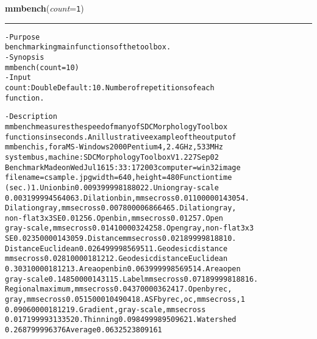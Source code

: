     \begin{boxedminipage}{\textwidth}

    \raggedright \textbf{mmbench}(\textit{count}=\texttt{1\-})

    \vspace{-1.5ex}

    \rule{\textwidth}{0.5\fboxrule}
\begin{alltt}
- Purpose
    benchmarking main functions of the toolbox.
- Synopsis
    mmbench(count=10)
- Input
    count: Double Default: 10. Number of repetitions of each
           function.

- Description
    mmbench measures the speed of many of SDC Morphology Toolbox
    functions in seconds. An illustrative example of the output of
    mmbench is, for a MS-Windows 2000 Pentium 4, 2.4GHz, 533MHz
    system bus, machine: SDC Morphology Toolbox V1.2 27Sep02
    Benchmark Made on Wed Jul 16 15:33:17 2003 computer= win32 image
    filename= csample.jpg width= 640 , height= 480 Function time
    (sec.) 1. Union bin 0.00939999818802 2. Union gray-scale
    0.00319999456406 3. Dilation bin, mmsecross 0.0110000014305 4.
    Dilation gray, mmsecross 0.00780000686646 5. Dilation gray,
    non-flat 3x3 SE 0.0125 6. Open bin, mmsecross 0.0125 7. Open
    gray-scale, mmsecross 0.0141000032425 8. Open gray, non-flat 3x3
    SE 0.0235000014305 9. Distance mmsecross 0.021899998188 10.
    Distance Euclidean 0.0264999985695 11. Geodesic distance
    mmsecross 0.028100001812 12. Geodesic distance Euclidean
    0.303100001812 13. Area open bin 0.0639999985695 14. Area open
    gray-scale 0.148500001431 15. Label mmsecross 0.071899998188 16.
    Regional maximum, mmsecross 0.043700003624 17. Open by rec,
    gray, mmsecross 0.0515000104904 18. ASF by rec, oc, mmsecross, 1
    0.090600001812 19. Gradient, gray-scale, mmsecross
    0.0171999931335 20. Thinning 0.0984999895096 21. Watershed
    0.268799996376 Average 0.0632523809161\end{alltt}

    \vspace{1ex}

    \end{boxedminipage}

    \label{multireg:num_pymorph:mmbinary}
    \vspace{0.5ex}

